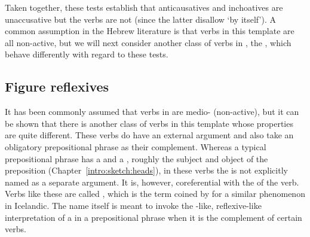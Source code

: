 \begin{exe}
\begin{xlist}
\begin{xlist}
\begin{exe}
\begin{xlist}
\begin{xlist}
\begin{exe}
\begin{xlist}
\begin{xlist}
\begin{exe}
\begin{exe}
\begin{xlist}
\begin{exe}
\begin{exe}
\begin{xlist}
		
 \z
\z 

Taken together, these tests establish that anticausatives and inchoatives are unaccusative but the  verbs are not (since the latter disallow `by itself'). A common assumption in the Hebrew literature is that verbs in this template are all non-active, but we will next consider another class of verbs in {\tnif}, the , which behave differently with regard to these tests.

	\subsection{Figure reflexives} \label{vz:tnif:figrefl}
It has been commonly assumed that verbs in {\tnif} are medio- (non-active), but it can be shown that there is another class of verbs in this template whose properties are quite different. These verbs do have an external argument and also take an obligatory prepositional phrase as their complement. Whereas a typical prepositional phrase has a  and a , roughly the subject and object of the preposition (Chapter~\ref{intro:sketch:heads}), in these verbs the  is not explicitly named as a separate argument. It is, however, coreferential with the  of the verb. Verbs like these are called \emph{}, which is the term coined by \cite{wood14nllt} for a similar phenomenon in Icelandic. The name itself is meant to invoke the -like, reflexive-like interpretation of a  in a prepositional phrase when it is the complement of certain verbs.\label{r1:3:2}


\end{xlist}
\end{exe}
\end{exe}
\end{xlist}
\end{exe}
\end{exe}
\end{xlist}
\end{xlist}
\end{exe}
\end{xlist}
\end{xlist}
\end{exe}
\end{xlist}
\end{xlist}
\end{exe}
